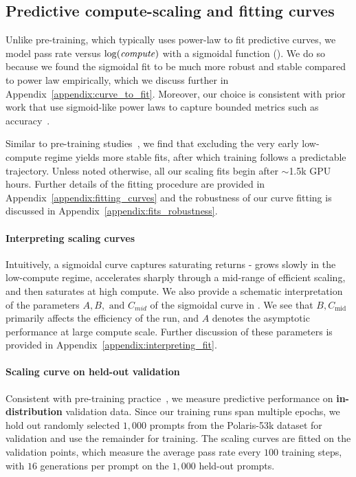 \subsection{Predictive compute-scaling and fitting curves}


Unlike pre-training, which typically uses power-law to fit predictive curves, we model pass rate versus $\log(\text{\emph{compute}})$ with a sigmoidal function (). We do so because we found the sigmoidal fit to be much more robust and stable compared to power law empirically, which we discuss further in Appendix~\ref{appendix:curve_to_fit}. Moreover, our choice is consistent with prior work that use sigmoid-like power laws to capture bounded metrics such as accuracy~\citep{ruan2024,srivastava2022bigbench}.  




Similar to pre-training studies~\citep{misfitting,porian2025}, we find that excluding the very early low-compute regime yields more stable fits, after which training follows a predictable trajectory. Unless noted otherwise, all our scaling fits begin after $\sim$1.5k GPU hours. Further details of the fitting procedure are provided in Appendix~\ref{appendix:fitting_curves} and the robustness of our curve fitting is discussed in Appendix~\ref{appendix:fits_robustness}. 

\paragraph{Interpreting scaling curves} Intuitively, a sigmoidal curve captures saturating returns - grows slowly in the low-compute regime, accelerates sharply through a mid-range of efficient scaling, and then saturates at high compute. We also provide a schematic interpretation of the parameters $A, B, \text{ and } C_{mid}$ of the sigmoidal curve in . We see that $B, C_\text{mid}$ primarily affects the efficiency of the run, and $A$ denotes the asymptotic performance at large compute scale. Further discussion of these parameters is provided in Appendix~\ref{appendix:interpreting_fit}.

\paragraph{Scaling curve on held-out validation}
Consistent with pre-training practice~\citep{hoffmann2022training,porian2025}, we measure predictive performance on \textbf{in-distribution} validation data. Since our training runs span multiple epochs, we hold out randomly selected $1,000$ prompts from the Polaris-53k dataset for validation and use the remainder for training. The scaling curves are fitted on the validation points, which measure the average pass rate every $100$ training steps, with $16$ generations per prompt on the $1,000$ held-out prompts. 



